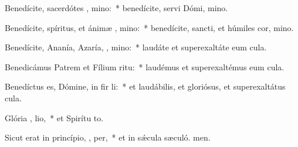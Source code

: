 \item Benedícite, sacerdótes , mino:~* benedícite, servi Dómi, mino.
\item Benedícite, spíritus, et ánimæ , mino:~* benedícite, sancti, et húmiles cor, mino.
\item Benedícite, Ananía, Azaría, , mino:~* laudáte et superexaltáte eum  cula.
\item Benedicámus Patrem et Fílium   ritu:~* laudémus et superexaltémus eum  cula.
\item Benedíctus es, Dómine, in fir li:~* et laudábilis, et gloriósus, et superexaltátus  cula.
\item Glória ,  lio,~* et Spirítu to.
\item Sicut erat in princípio,  ,  per,~* et in sǽcula sæculó. men.
